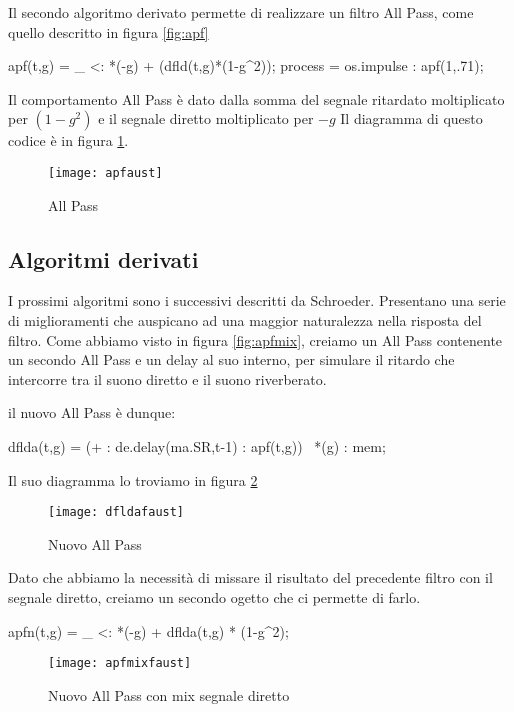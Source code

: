 Il secondo algoritmo derivato permette di realizzare un filtro All Pass, come quello descritto in figura \ref{fig:apf}

\begin{code}
apf(t,g) = _ <: *(-g) + (dfld(t,g)*(1-g^2));
process = os.impulse : apf(1,.71);
\end{code}

Il comportamento All Pass è dato dalla somma del segnale ritardato moltiplicato per $(1-g^2)$ e il segnale diretto moltiplicato per $-g$
Il diagramma di questo codice è in figura \ref{fig:apfaust}.

\begin{figure}[htp]
\centering
\texttt{[image: apfaust]}
\caption{All Pass}
\label{fig:apfaust}
\end{figure}

\subsection{Algoritmi derivati}

I prossimi algoritmi sono i successivi descritti da Schroeder. Presentano una serie di miglioramenti che auspicano ad una maggior naturalezza nella risposta del filtro. 
Come abbiamo visto in figura \ref{fig:apfmix}, creiamo un All Pass contenente un secondo All Pass e un delay al suo interno, per simulare il ritardo che intercorre tra il suono diretto e il suono riverberato.

\smallskip

il nuovo All Pass è dunque:
\begin{code}
dflda(t,g) =  (+ : de.delay(ma.SR,t-1) : apf(t,g))~ *(g) : mem;
\end{code}

Il suo diagramma lo troviamo in figura \ref{fig:dfldafaust}

\begin{figure}[htp]
\centering
\texttt{[image: dfldafaust]}
\caption{Nuovo All Pass}
\label{fig:dfldafaust}
\end{figure}

Dato che abbiamo la necessità di missare il risultato del precedente filtro con il segnale diretto, creiamo un secondo ogetto che ci permette di farlo.

\begin{code}
apfn(t,g) = _ <: *(-g) + dflda(t,g) * (1-g^2);
\end{code}

\begin{figure}[htp]
\centering
\texttt{[image: apfmixfaust]}
\caption{Nuovo All Pass con mix segnale diretto}
\label{fig:apfmixfaust}
\end{figure}

